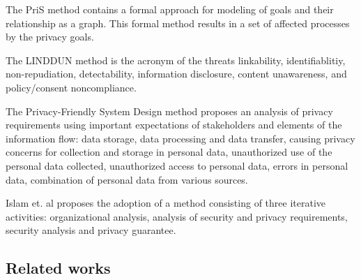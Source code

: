 \documentclass[conference]{IEEEtran}
\begin{document}
The PriS method contains a formal approach for modeling of goals and their relationship as a graph. This formal method results in a set of affected processes by the privacy goals.

The LINDDUN method is the acronym of the threats linkability, identifiablitiy, non-repudiation, detectability, information disclosure, content unawareness, and policy/consent noncompliance.


The Privacy-Friendly System Design method proposes an analysis of privacy requirements using important expectations of stakeholders and elements of the information flow: data storage, data processing and data transfer, causing privacy concerns for collection and storage in
personal data, unauthorized use of the personal data collected,
unauthorized access to personal data, errors in personal data,
combination of personal data from various sources.


Islam et. al \cite{DBLP:journals/tcc/IslamOKMG18} proposes the adoption of a method consisting of three iterative activities: organizational analysis, analysis of security and privacy requirements, security analysis and privacy guarantee.

\subsection{Related works}

\end{document}
